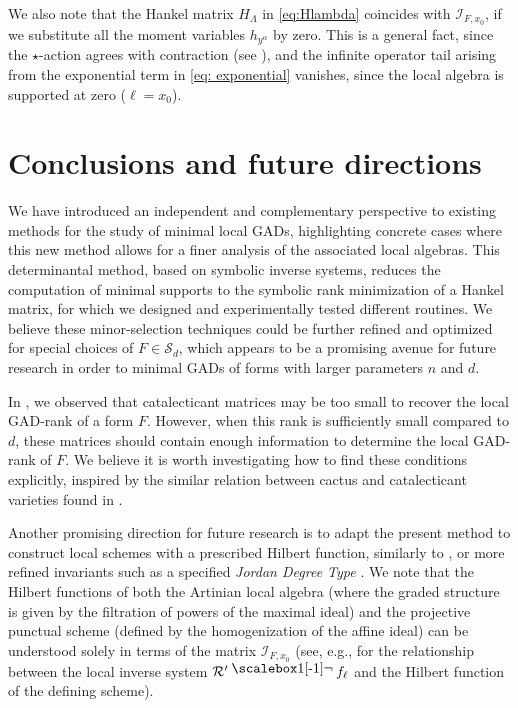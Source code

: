 \documentclass{amsart}
\theoremstyle{plain}
\renewcommand{\S}{\mathcal{S}}
\newcommand{\Ann}{\textnormal{Ann}}
\newcommand{\contract}{\mathbin{\mathpalette\dointprod\relax}}
\newcommand{\dointprod}[2]{%
  \raisebox{\depth}{\scalebox{1}[-1]{$#1\lnot$}}}
\def\R{\mathcal{R}}
\def\Ann{\mathrm{Ann}}
\numberwithin{equation}{section}
\begin{document}
We also note that the Hankel matrix $H_\Lambda$ in \cref{eq:Hlambda} coincides with $\mathcal{I}_{F,x_0}$, if we substitute all the moment variables $h_{y^\alpha}$ by zero.
This is a general fact, since the $\star$-action agrees with contraction (see ), %
and the infinite operator tail arising from the exponential term in \cref{eq: exponential} vanishes, since the local algebra is supported at zero ($\ell = x_0$).



\section{Conclusions and future directions} \label{sec:conclusion}

We have introduced an independent and complementary perspective to existing methods for the study of minimal local GADs, highlighting concrete cases where this new method allows for a finer analysis of the associated local algebras.
This determinantal method, based on symbolic inverse systems, reduces the computation of minimal supports to the symbolic rank minimization of a Hankel matrix, for which we designed and experimentally tested different routines.
We believe these minor-selection techniques could be further refined and optimized for special choices of $F \in \S_d$, which appears to be a promising avenue for future research in order to minimal GADs of forms with larger parameters $n$ and $d$.

In , we observed that catalecticant matrices may be too small to recover the local GAD-rank of a form $F$.
However, when this rank is sufficiently small compared to $d$, these matrices should contain enough information to %
determine the local GAD-rank of $F$.
We believe it is worth investigating how to find these conditions explicitly, inspired by the similar relation between cactus and catalecticant varieties found in \cite[Thm. 1.7]{BB14}.

Another promising direction for future research is to adapt the present method to construct local schemes with a prescribed Hilbert function, similarly to \cite{BJMR18}, or more refined invariants such as a specified \emph{Jordan Degree Type} \cite{IMM22}.
We note that the Hilbert functions of both the Artinian local algebra (where the graded structure is given by the filtration of powers of the maximal ideal) and the projective punctual scheme (defined by the homogenization of the affine ideal) can be understood solely in terms of the matrix $\mathcal{I}_{F,x_0}$ (see, e.g., \cite{CI12} for the relationship between the local inverse system $\R'\contract f_{\ell}$ and the Hilbert function of the defining scheme).
\end{document}

